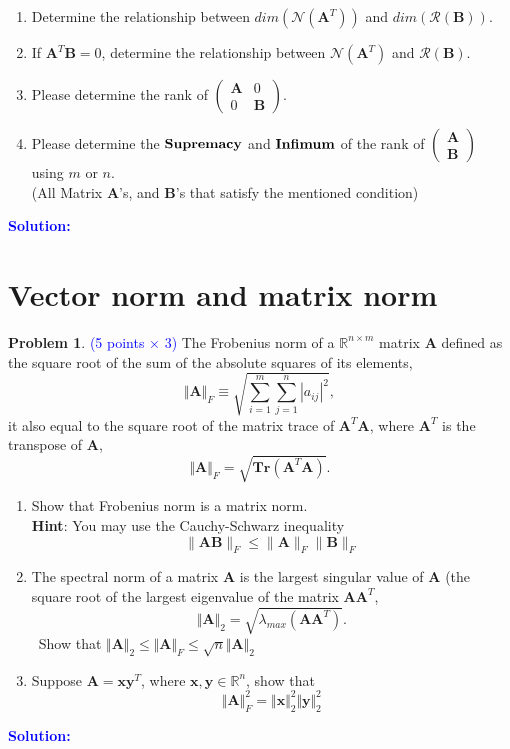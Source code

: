 \documentclass[english,onecolumn]{IEEEtran}
\newcommand{\Ab}{\mathbf{A}}
\newcommand{\Bb}{\mathbf{B}}
\begin{document}
\begin{enumerate}
    \item Determine the relationship between $dim(\mathcal{N}(\mathbf{A}^T)) $ and $dim(\mathcal{R}(\mathbf{B})) $.%
    \item If $ \mathbf{A}^T \mathbf{B}=0 $, determine the relationship between $\mathcal{N}(\mathbf{A}^T) $ and $\mathcal{R}(\mathbf{B}) $. 
     \item Please determine the rank of $\left( 
  \begin{array}{cc}  
    \mathbf{A} & 0\\  
    0 & \mathbf{B}
  \end{array}
  \right) $.
     \item Please determine the $\bf{Supremacy}$ and $\bf{Infimum}$ of the rank of $\left(
  \begin{array}{cc}  
    \mathbf{A}\\  
    \mathbf{B}
  \end{array}
  \right) $ using $m$ or $n$. \\
  (All Matrix $\mathbf{A}$'s, and $\mathbf{B}$'s that satisfy the mentioned condition)  
 \end{enumerate}

\noindent\textcolor{blue}{
	\textbf{Solution:}
}

\newpage
\section{Vector norm and matrix norm}
\noindent\textbf{Problem 1}. \textcolor{blue}{(5 points $\times$ 3)}
 The Frobenius norm of a $\mathbb{R}^{n \times m}$ matrix $\mathbf{A}$ defined as the square root of the sum of the absolute squares of its elements, 
    $$\Vert  \mathbf{A} \Vert_F \equiv \sqrt{\sum_{i =1 }^m \sum_{j=1}^n |a_{ij}|^2}, $$
   it also equal to the square root of the matrix trace of $\mathbf{A}^T\mathbf{A}$, where $\mathbf{A}^T$ is the  transpose of $\mathbf{A}$,
    $$ \Vert  \mathbf{A} \Vert_F = \sqrt{\textbf{Tr}(\mathbf{A}^T\mathbf{A})}. $$
\begin{enumerate}
    \item Show that Frobenius norm is a matrix norm. \\
    \textbf{Hint}: You may use the Cauchy-Schwarz inequality $$\|\Ab\Bb\|_F \leq \|\Ab\|_F\|\Bb\|_F$$
    \item The spectral norm of a matrix $\mathbf{A}$ is the largest singular value of $\mathbf{A}$ (the square root of the largest eigenvalue of the matrix $\mathbf{AA}^T$,
    $$\Vert \mathbf{A} \Vert_2 = \sqrt{\lambda_{max}(\mathbf{AA}^T)} .$$\
    Show that $\Vert \mathbf{A} \Vert_2 \leq \Vert  \mathbf{A} \Vert_F \leq \sqrt{n} \Vert \mathbf{A} \Vert_2$ 
    \item Suppose $\mathbf{A} = \mathbf{xy}^T$, where $\mathbf{x,y} \in \mathbb{R}^n$, show that 
    $$\Vert \mathbf{A} \Vert_F^2 = \Vert \mathbf{x} \Vert_2^2\Vert \mathbf{y} \Vert_2^2$$
\end{enumerate}
\noindent\textcolor{blue}{
	\textbf{Solution:}
}
\end{document}
